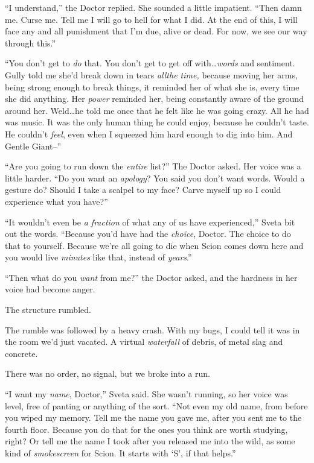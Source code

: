 ``I understand,'' the Doctor replied.  She sounded a little impatient.  ``Then damn me.  Curse me.  Tell me I will go to hell for what I did.  At the end of this, I will face any and all punishment that I'm due, alive or dead.  For now, we see our way through this.''



``You don't get to \emph{do} that.  You don't get to get off with\ldots \emph{words }and sentiment.  Gully told me she'd break down in tears \emph{all}\emph{the time, }because moving her arms, being strong enough to break things, it reminded her of what she is, every time she did anything.  Her \emph{power }reminded her, being constantly aware of the ground around her.  Weld\ldots he told me once that he felt like he was going crazy.  All he had was music.  It was the only\emph{ }human thing he could enjoy, because he couldn't taste.  He couldn't \emph{feel}, even when I squeezed him hard enough to dig into him.  And Gentle Giant--''



``Are you going to run down the \emph{entire} list?''  The Doctor asked.  Her voice was a little harder.  ``Do you want an \emph{apology}?  You said you don't want words.  Would a gesture do?  Should I take a scalpel to my face?  Carve myself up so I could experience what you have?''



``It wouldn't even be \emph{a fraction }of what any of us have experienced,'' Sveta bit out the words.  ``Because you'd have had the \emph{choice}, Doctor.  The choice to do that to yourself.  Because we're all going to die when Scion comes down here and you would live \emph{minutes} like that, instead of \emph{years}.''



``Then what do you \emph{want} from me?''  the Doctor asked, and the hardness in her voice had become anger.



The structure rumbled.



The rumble was followed by a heavy crash.  With my bugs, I could tell it was in the room we'd just vacated.  A virtual \emph{waterfall} of debris, of metal slag and concrete.



There was no order, no signal, but we broke into a run.



``I want my \emph{name}, Doctor,'' Sveta said.  She wasn't running, so her voice was level, free of panting or anything of the sort.  ``Not even my old name, from before you wiped my memory.  Tell me the name you gave me, after you sent me to the fourth floor.  Because you do that for the ones you think are worth studying, right?  Or tell me the name I took after you released me into the wild, as some kind of \emph{smokescreen} for Scion.  It starts with `S', if that helps.''



